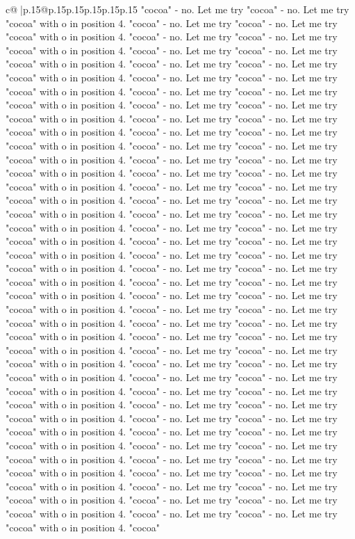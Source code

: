 \documentclass{article}
\begin{document}
{\begin{supertabular}{c@{$\;$}|p{.15\linewidth}@{}p{.15\linewidth}p{.15\linewidth}p{.15\linewidth}p{.15\linewidth}p{.15\linewidth}}
{{{"cocoa" {-} no. Let me try "cocoa" {-} no. Let me try "cocoa" with o in position 4. "cocoa" {-} no. Let me try "cocoa" {-} no. Let me try "cocoa" with o in position 4. "cocoa" {-} no. Let me try "cocoa" {-} no. Let me try "cocoa" with o in position 4. "cocoa" {-} no. Let me try "cocoa" {-} no. Let me try "cocoa" with o in position 4. "cocoa" {-} no. Let me try "cocoa" {-} no. Let me try "cocoa" with o in position 4. "cocoa" {-} no. Let me try "cocoa" {-} no. Let me try "cocoa" with o in position 4. "cocoa" {-} no. Let me try "cocoa" {-} no. Let me try "cocoa" with o in position 4. "cocoa" {-} no. Let me try "cocoa" {-} no. Let me try "cocoa" with o in position 4. "cocoa" {-} no. Let me try "cocoa" {-} no. Let me try "cocoa" with o in position 4. "cocoa" {-} no. Let me try "cocoa" {-} no. Let me try "cocoa" with o in position 4. "cocoa" {-} no. Let me try "cocoa" {-} no. Let me try "cocoa" with o in position 4. "cocoa" {-} no. Let me try "cocoa" {-} no. Let me try "cocoa" with o in position 4. "cocoa" {-} no. Let me try "cocoa" {-} no. Let me try "cocoa" with o in position 4. "cocoa" {-} no. Let me try "cocoa" {-} no. Let me try "cocoa" with o in position 4. "cocoa" {-} no. Let me try "cocoa" {-} no. Let me try "cocoa" with o in position 4. "cocoa" {-} no. Let me try "cocoa" {-} no. Let me try "cocoa" with o in position 4. "cocoa" {-} no. Let me try "cocoa" {-} no. Let me try "cocoa" with o in position 4. "cocoa" {-} no. Let me try "cocoa" {-} no. Let me try "cocoa" with o in position 4. "cocoa" {-} no. Let me try "cocoa" {-} no. Let me try "cocoa" with o in position 4. "cocoa" {-} no. Let me try "cocoa" {-} no. Let me try "cocoa" with o in position 4. "cocoa" {-} no. Let me try "cocoa" {-} no. Let me try "cocoa" with o in position 4. "cocoa" {-} no. Let me try "cocoa" {-} no. Let me try "cocoa" with o in position 4. "cocoa" {-} no. Let me try "cocoa" {-} no. Let me try "cocoa" with o in position 4. "cocoa" {-} no. Let me try "cocoa" {-} no. Let me try "cocoa" with o in position 4. "cocoa" {-} no. Let me try "cocoa" {-} no. Let me try "cocoa" with o in position 4. "cocoa" {-} no. Let me try "cocoa" {-} no. Let me try "cocoa" with o in position 4. "cocoa" {-} no. Let me try "cocoa" {-} no. Let me try "cocoa" with o in position 4. "cocoa" {-} no. Let me try "cocoa" {-} no. Let me try "cocoa" with o in position 4. "cocoa" {-} no. Let me try "cocoa" {-} no. Let me try "cocoa" with o in position 4. "cocoa" {-} no. Let me try "cocoa" {-} no. Let me try "cocoa" with o in position 4. "cocoa" {-} no. Let me try "cocoa" {-} no. Let me try "cocoa" with o in position 4. "cocoa" {-} no. Let me try "cocoa" {-} no. Let me try "cocoa" with o in position 4. "cocoa" {-} no. Let me try "cocoa" {-} no. Let me try "cocoa" with o in position 4. "cocoa" {-} no. Let me try "cocoa" {-} no. Let me try "cocoa" with o in position 4. "cocoa" {-} no. Let me try "cocoa" {-} no. Let me try "cocoa" with o in position 4. "cocoa" {-} no. Let me try "cocoa" {-} no. Let me try "cocoa" with o in position 4. "cocoa" {-} no. Let me try "cocoa" {-} no. Let me try "cocoa" with o in position 4. "cocoa" {-} no. Let me try "cocoa" {-} no. Let me try "cocoa" with o in position 4. "cocoa" }}}
\end{supertabular}}
\end{document}
